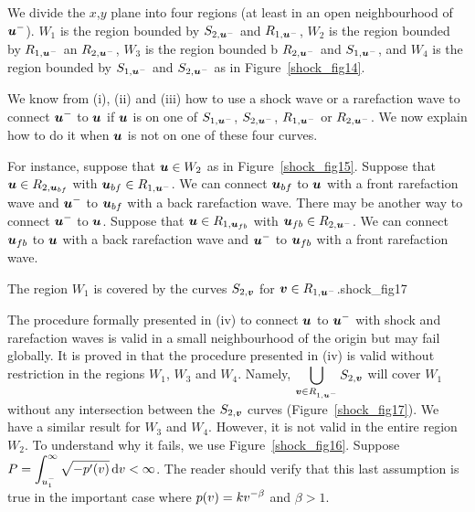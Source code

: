 \begin{egg}
 We divide the $x$,$y$ plane into four regions (at least in
an open neighbourhood of $\displaystyle {\bm{u}}^-$).  $W_1$ is the
region bounded by  $S_{2,{\bm{u}}^-}$ and $R_{1,{\bm{u}}^-}$, $W_2$ is
the region bounded
by $R_{1,{\bm{u}}^-}$ an $R_{2,{\bm{u}}^-}$, $W_3$ is the region bounded
b $R_{2,{\bm{u}}^-}$ and $S_{1,{\bm{u}}^-}$, and $W_4$ is the region
bounded by $S_{1,{\bm{u}}^-}$ and $S_{2,{\bm{u}}^-}$ as in
Figure~\ref{shock_fig14}.

We know from (i), (ii) and (iii) how to use a shock wave or a
rarefaction wave to connect $\displaystyle {\bm{u}}^-$ to ${\bm{u}}$
if ${\bm{u}}$ is on one of $S_{1,{\bm{u}}^-}$, $S_{2,{\bm{u}}^-}$,
$R_{1,{\bm{u}}^-}$ or $R_{2,{\bm{u}}^-}$.  We now explain how to do it
when ${\bm{u}}$ is not on one of these four curves.

For instance, suppose that ${\bm{u}} \in W_2$ as in
Figure~\ref{shock_fig15}.  Suppose that
${\bm{u}} \in R_{2,{\bm{u}}_{bf}}$ with ${\bm{u}}_{bf} \in R_{1,{\bm{u}}^-}$.
We can connect ${\bm{u}}_{bf}$ to ${\bm{u}}$ with a front rarefaction wave and
$\displaystyle {\bm{u}}^-$ to ${\bm{u}}_{bf}$ with a back rarefaction wave.
There may be another way to connect $\displaystyle {\bm{u}}^-$ to ${\bm{u}}$.
Suppose that ${\bm{u}} \in R_{1,{\bm{u}}_{fb}}$ with
${\bm{u}}_{fb} \in R_{2,{\bm{u}}^-}$.  We can
connect ${\bm{u}}_{fb}$ to ${\bm{u}}$ with a back rarefaction wave and
$\displaystyle {\bm{u}}^-$ to ${\bm{u}}_{fb}$ with a front rarefaction wave.


{The region $W_1$ is covered by the curves $S_{2,{\bm{v}}}$ for
${\bm{v}} \in R_{1,{\bm{u}}^-}$.}{shock_fig17}

 The procedure formally presented in (iv) to connect
${\bm{u}}$ to $\displaystyle {\bm{u}}^-$ with shock and rarefaction
waves is valid in a small neighbourhood of the origin but may fail
globally.  It is proved in \cite{Smo} that the procedure presented in
(iv) is valid without restriction in the regions $W_1$, $W_3$ and $W_4$.
Namely, $\displaystyle \bigcup_{{\bm{v}}\in R_{1,{\bm{u}}^-}} S_{2,{\bm{v}}}$
will cover $W_1$ without any intersection between the $S_{2,{\bm{v}}}$
curves (Figure~\ref{shock_fig17}).  We have a similar result for $W_3$
and $W_4$.  However, it is not valid in the entire region $W_2$.  To
understand why it fails, we use Figure~\ref{shock_fig16}.
Suppose $\displaystyle P = \int_{u_1^-}^\infty \sqrt{-p'(v)}\,\mathrm{d}{v} < \infty$.
The reader should verify that this last assumption is true in the
important case where $\displaystyle p(v) = kv^{-\beta}$ and $\beta >1$.


\end{egg}
